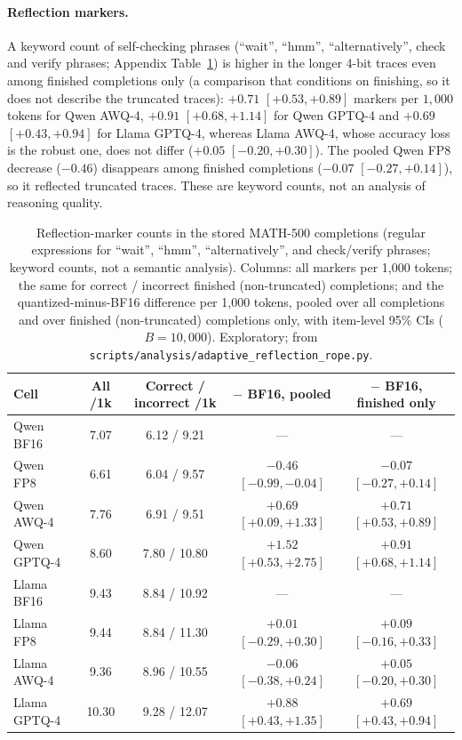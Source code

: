 \documentclass[11pt,a4paper]{article}
\begin{document}
\paragraph{Reflection markers.} A keyword count of self-checking phrases (``wait'', ``hmm'', ``alternatively'', check and verify phrases; Appendix Table~\ref{tab:reflection}) is higher in the longer 4-bit traces even among finished completions only (a comparison that conditions on finishing, so it does not describe the truncated traces): $+0.71$ $[+0.53,+0.89]$ markers per $1{,}000$ tokens for Qwen AWQ-4, $+0.91$ $[+0.68,+1.14]$ for Qwen GPTQ-4 and $+0.69$ $[+0.43,+0.94]$ for Llama GPTQ-4, whereas Llama AWQ-4, whose accuracy loss is the robust one, does not differ ($+0.05$ $[-0.20,+0.30]$). The pooled Qwen FP8 decrease ($-0.46$) disappears among finished completions ($-0.07$ $[-0.27,+0.14]$), so it reflected truncated traces. These are keyword counts, not an analysis of reasoning quality.

\begin{table}[!htbp]
\centering
\caption{Reflection-marker counts in the stored MATH-500 completions (regular expressions for ``wait'', ``hmm'', ``alternatively'', and check/verify phrases; keyword counts, not a semantic analysis). Columns: all markers per 1{,}000 tokens; the same for correct / incorrect finished (non-truncated) completions; and the quantized-minus-BF16 difference per 1{,}000 tokens, pooled over all completions and over finished (non-truncated) completions only, with item-level 95\% CIs ($B=10{,}000$). Exploratory; from \texttt{scripts/analysis/adaptive\_reflection\_rope.py}.}
\label{tab:reflection}
\footnotesize
\setlength{\tabcolsep}{2.5pt}
\begin{tabular}{lcccc}
\toprule
\textbf{Cell} & \textbf{All /1k} & \textbf{Correct / incorrect /1k} & \textbf{$-$ BF16, pooled} & \textbf{$-$ BF16, finished only} \\
\midrule
Qwen BF16 & 7.07 & 6.12 / 9.21 & --- & --- \\
Qwen FP8 & 6.61 & 6.04 / 9.57 & $-0.46$ $[-0.99,-0.04]$ & $-0.07$ $[-0.27,+0.14]$ \\
Qwen AWQ-4 & 7.76 & 6.91 / 9.51 & $+0.69$ $[+0.09,+1.33]$ & $+0.71$ $[+0.53,+0.89]$ \\
Qwen GPTQ-4 & 8.60 & 7.80 / 10.80 & $+1.52$ $[+0.53,+2.75]$ & $+0.91$ $[+0.68,+1.14]$ \\
\midrule
Llama BF16 & 9.43 & 8.84 / 10.92 & --- & --- \\
Llama FP8 & 9.44 & 8.84 / 11.30 & $+0.01$ $[-0.29,+0.30]$ & $+0.09$ $[-0.16,+0.33]$ \\
Llama AWQ-4 & 9.36 & 8.96 / 10.55 & $-0.06$ $[-0.38,+0.24]$ & $+0.05$ $[-0.20,+0.30]$ \\
Llama GPTQ-4 & 10.30 & 9.28 / 12.07 & $+0.88$ $[+0.43,+1.35]$ & $+0.69$ $[+0.43,+0.94]$ \\
\bottomrule
\end{tabular}
\end{table}
\end{document}
